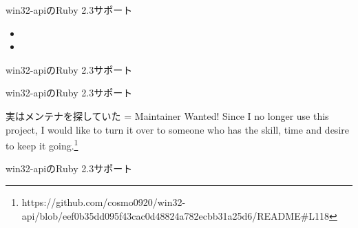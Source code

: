\documentclass[12pt, unicode]{beamer}
\begin{document}
\begin{frame}{win32-apiのRuby 2.3サポート}
  \Large {
    \begin{block}{}
      \begin{itemize}
      \item {}
      \item {}
      \end{itemize}
    \end{block}
  }
\end{frame}

\begin{frame}{win32-apiのRuby 2.3サポート}
  \Large {
  }
\end{frame}

\begin{frame}{win32-apiのRuby 2.3サポート}
  \begin{block}{実はメンテナを探していた}
= Maintainer Wanted!
Since I no longer use this project, I would like to turn it over to
someone who has the skill, time and desire to keep it going.\footnote[frame]{https://github.com/cosmo0920/win32-api/blob/eef0b35dd095f43cac0d48824a782ecbb31a25d6/README\#L118}\newline
{}
  \end{block}
\end{frame}

\begin{frame}{win32-apiのRuby 2.3サポート}
  \Large {
    \newline
    \small{}
  }
\end{frame}
\end{document}
